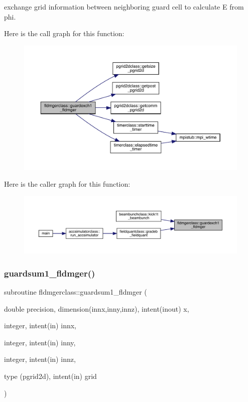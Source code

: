 exchange grid information between neighboring guard cell to calculate E from phi. 

Here is the call graph for this function\+:
\nopagebreak
\begin{figure}[H]
\begin{center}
\leavevmode
\includegraphics[width=350pt]{namespacefldmgerclass_a028236bf0d8419b6f75a7fb28eb7226b_cgraph}
\end{center}
\end{figure}
Here is the caller graph for this function\+:
\nopagebreak
\begin{figure}[H]
\begin{center}
\leavevmode
\includegraphics[width=350pt]{namespacefldmgerclass_a028236bf0d8419b6f75a7fb28eb7226b_icgraph}
\end{center}
\end{figure}
\mbox{\label{namespacefldmgerclass_a54886b0763b8458a0560ccf7087b07f1}} 
\subsubsection{\texorpdfstring{guardsum1\_fldmger()}{guardsum1\_fldmger()}}
{\footnotesize\ttfamily subroutine fldmgerclass\+::guardsum1\+\_\+fldmger (\begin{DoxyParamCaption}\item[{double precision, dimension(innx,inny,innz), intent(inout)}]{x,  }\item[{integer, intent(in)}]{innx,  }\item[{integer, intent(in)}]{inny,  }\item[{integer, intent(in)}]{innz,  }\item[{type (pgrid2d), intent(in)}]{grid }\end{DoxyParamCaption})}



